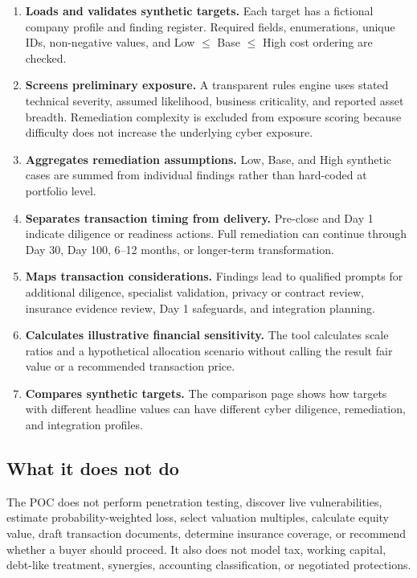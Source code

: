 \documentclass[11pt,a4paper]{article}
\begin{document}
\begin{enumerate}
  \item \textbf{Loads and validates synthetic targets.} Each target has a fictional company profile and finding register. Required fields, enumerations, unique IDs, non-negative values, and Low $\leq$ Base $\leq$ High cost ordering are checked.
  \item \textbf{Screens preliminary exposure.} A transparent rules engine uses stated technical severity, assumed likelihood, business criticality, and reported asset breadth. Remediation complexity is excluded from exposure scoring because difficulty does not increase the underlying cyber exposure.
  \item \textbf{Aggregates remediation assumptions.} Low, Base, and High synthetic cases are summed from individual findings rather than hard-coded at portfolio level.
  \item \textbf{Separates transaction timing from delivery.} Pre-close and Day 1 indicate diligence or readiness actions. Full remediation can continue through Day 30, Day 100, 6--12 months, or longer-term transformation.
  \item \textbf{Maps transaction considerations.} Findings lead to qualified prompts for additional diligence, specialist validation, privacy or contract review, insurance evidence review, Day 1 safeguards, and integration planning.
  \item \textbf{Calculates illustrative financial sensitivity.} The tool calculates scale ratios and a hypothetical allocation scenario without calling the result fair value or a recommended transaction price.
  \item \textbf{Compares synthetic targets.} The comparison page shows how targets with different headline values can have different cyber diligence, remediation, and integration profiles.
\end{enumerate}

\subsection{What it does not do}

The POC does not perform penetration testing, discover live vulnerabilities, estimate probability-weighted loss, select valuation multiples, calculate equity value, draft transaction documents, determine insurance coverage, or recommend whether a buyer should proceed. It also does not model tax, working capital, debt-like treatment, synergies, accounting classification, or negotiated protections.
\end{document}

